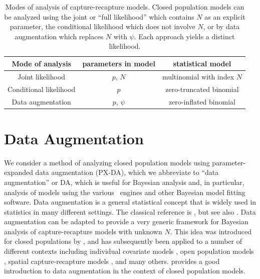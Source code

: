 \begin{table}[ht]
\centering
\caption{Modes of analysis of capture-recapture models. Closed
  population models can be analyzed using the joint or ``full
  likelihood'' which contains $N$ as an explicit parameter, the
  conditional likelihood which does not involve $N$, or by data
  augmentation which replaces $N$ with $\psi$. Each approach yields a
  distinct likelihood.}
\begin{tabular}{ccc}
\hline \hline 
Mode of analysis & parameters in model & statistical model \\ \hline
Joint likelihood                &	$p$, $N$	&	multinomial with index $N$\\
Conditional likelihood 		&	$p$	&	zero-truncated binomial \\
Data augmentation		&	$p$, $\psi$	&
zero-inflated binomial\\
\hline
\end{tabular}
\label{tab.3.modes}
\end{table}



\section{Data Augmentation }
\label{closed.sec.da}

We consider a method of analyzing closed population models using
parameter-expanded data augmentation (PX-DA), which we abbreviate to
``data augmentation'' or DA, which is useful for Bayesian analysis
and, in particular, analysis of models using the various \bugs~engines
and other Bayesian model fitting software.  Data augmentation is a
general statistical concept that is widely used in statistics in many
different settings. The classical reference is
\citet{tanner_wong:1987}, but see also \citet{liu_wu:1999}.  Data
augmentation can be adapted to provide a very generic framework for
Bayesian analysis of capture-recapture models with unknown $N$. This
idea was introduced for closed populations by \citet{royle_etal:2007},
and has subsequently been applied to a number of different contexts
including individual covariate models \citep{royle:2009}, open
population models \citep{royle_dorazio:2008,royle_dorazio:2012,
  gardner_etal:2010ecol}, spatial capture-recapture models
\citep{royle_young:2008, royle_etal:2010, gardner_etal:2009}, and many
others. \citet[][Chapt. 6]{kery_schaub:2011} provides a good
introduction to data augmentation in the context of closed population
models.



